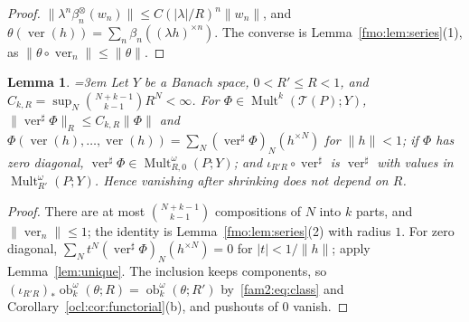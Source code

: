 \documentclass[11pt]{amsart}
\newtheorem{lemma}[theorem]{Lemma}
\theoremstyle{definition}
\theoremstyle{remark}
\numberwithin{equation}{section}
\newcommand{\Mult}{\operatorname{Mult}}
\newcommand{\abs}[1]{\lvert #1\rvert}
\newcommand{\norm}[1]{\lVert #1\rVert}
\theoremstyle{plain}
\theoremstyle{definition}
\theoremstyle{plain}
\newcommand{\ob}{\operatorname{ob}}
\begin{document}
\begin{proof}
$\norm{\lambda^n\beta^\otimes_n(w_n)}\le C(\abs\lambda/R)^n\norm{w_n}$, and $\theta(\operatorname{ver}(h))=\sum_n\beta_n
((\lambda h)^{\times n})$. The converse is Lemma~\ref{fmo:lem:series}(1), as $\norm{\theta\circ\operatorname{ver}_n}\le
\norm\theta$.
\end{proof}

\begin{lemma}\label{fmo:lem:veronese}\emergencystretch=3em
Let $Y$ be a Banach space, $0<R'\le R<1$, and $C_{k,R}=\sup_N\binom{N+k-1}{k-1}R^N<\infty$. For
$\Phi\in\Mult^k(\mathcal T(P);Y)$, $\norm{\operatorname{ver}^\sharp\Phi}_R\le C_{k,R}\norm\Phi$ and
$\Phi(\operatorname{ver}(h),\dots,\operatorname{ver}(h))=\sum_N(\operatorname{ver}^\sharp\Phi)_N(h^{\times N})$ for
$\norm h<1$; if $\Phi$ has zero diagonal, $\operatorname{ver}^\sharp\Phi\in\Mult^\omega_{R,0}(P;Y)$; and
$\iota_{R'R}\circ\operatorname{ver}^\sharp$ is $\operatorname{ver}^\sharp$ with values in $\Mult^\omega_{R'}(P;Y)$. Hence
vanishing after shrinking does not depend on $R$.
\end{lemma}

\begin{proof}
There are at most $\binom{N+k-1}{k-1}$ compositions of $N$ into $k$ parts, and $\norm{\operatorname{ver}_n}\le1$; the identity
is Lemma~\ref{fmo:lem:series}(2) with radius $1$. For zero diagonal, $\sum_Nt^N(\operatorname{ver}^\sharp\Phi)_N(h^{\times N})=0$
for $\abs t<1/\norm h$; apply Lemma~\ref{lem:unique}. The inclusion keeps components, so $(\iota_{R'R})_*\ob^\omega_k(\theta;R)=
\ob^\omega_k(\theta;R')$ by~\eqref{fam2:eq:class} and Corollary~\ref{ocl:cor:functorial}(b), and pushouts of $0$ vanish.
\end{proof}
\end{document}

